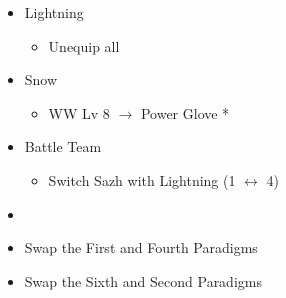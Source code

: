 \begin{multicols}{2}
\begin{menu}
\begin{itemize}
\begin{itemize}
			\end{itemize}
			\equip
			\begin{itemize}
				\item Lightning
				      \begin{itemize}
					      \item Unequip all
				      \end{itemize}
				\item Snow
				      \begin{itemize}
					      \item WW Lv 8 $\rightarrow$ Power Glove *
				      \end{itemize}
			\end{itemize}
			\paradigm
			\begin{itemize}
				\item Battle Team
				      \begin{itemize}
					      \item Switch Sazh with Lightning (1 $\leftrightarrow$ 4)
				      \end{itemize}
				\item {}%
				      {\paradigmline{\com}{\sen}{\med}}%
				      {\paradigmline{(\rav)}{\rav}{\rav}}%
				      {\paradigmline{(\rav)}{\sen}{(\rav)}}%
				      {\paradigmline{\rav}{\com}{(\com)}}%
				      {\paradigmline{\rav}{\com}{(\rav)}}%
				      {\paradigmline[6]{\textit{(\com)}}{\textit{\com}}{\textit{(\com)}}}
				\item Swap the First and Fourth Paradigms
				\item Swap the Sixth and Second Paradigms
			\end{itemize}
		\end{itemize}
	\end{menu}


\end{multicols}
